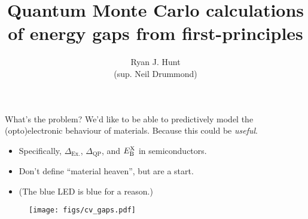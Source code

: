 \documentclass[10pt, pdf, hyperref={draft}, usenames, dvipsnames]{beamer}
\title{{\LARGE Quantum Monte Carlo calculations of energy gaps from
first-principles}}
\author{\large Ryan J. Hunt \\ (sup. Neil Drummond)}
\institute[]{\normalsize
  Department of Physics,\\
  Lancaster University
}
\date{}
\begin{document}
\begin{frame}[plain]
  \titlepage
\end{frame}





\begin{frame}{What's the problem?}
We'd like to be able to predictively model the (opto)electronic behaviour of
materials. Because this could be {\it useful}.
\vfill
\begin{minipage}[t]{0.55\textwidth}
\vspace{1.2cm}
\begin{itemize}
  \item Specifically, $\Delta_{\text{Ex.}}$, $\Delta_{\text{QP}}$, and $E^{\rm
  X}_{\rm B}$ in semiconductors.\footnotemark
  \item Don't define ``material heaven'', but are a start.
  \item (The blue LED is blue for a reason.)
\end{itemize}
\end{minipage}%
\hfill
\begin{minipage}[t]{0.4\textwidth}
\vspace{0pt}
\begin{figure}[H]
  \centering
  \texttt{[image: figs/cv\_gaps.pdf]}
\label{fig:name}
\end{figure}
\end{minipage}%
\end{frame}
\end{document}
